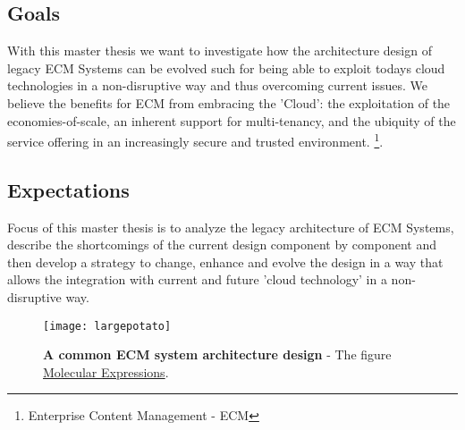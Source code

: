\subsection{Goals} %
With this master thesis we want to investigate how the architecture design of legacy ECM Systems can be evolved such for being able to exploit todays cloud technologies in a non-disruptive way and thus overcoming current issues.  We believe the benefits for ECM from embracing the 'Cloud': the exploitation of the economies-of-scale, an inherent support for multi-tenancy, and the ubiquity of the service offering in an increasingly secure and trusted environment. \footnote{Enterprise Content Management - ECM}.  

\subsection{Expectations} %
Focus of this master thesis is to analyze the legacy architecture of ECM Systems, describe the shortcomings of the current design component by component and then develop a strategy to change, enhance and evolve the design in a way that allows the integration with current and future 'cloud technology’ in a non-disruptive way.







\begin{figure}[htb]
  \centering
  \texttt{[image: largepotato]}
  \caption[Place your ECM picture here ]{\textbf{A common ECM system architecture design} - The figure 
  \href{http://molecularexpressions.com/micro/gallery/burgersnfries/burgersnfries4.html}{Molecular Expressions}.}
  \label{fig:largepotato}
\end{figure}

